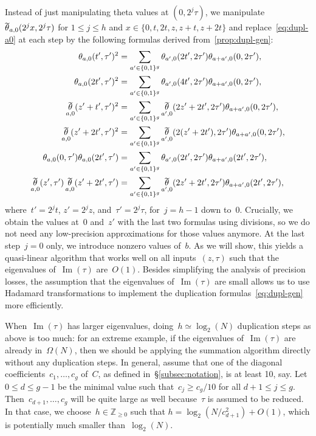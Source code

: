 \documentclass[12pt,oneside]{amsart}
\numberwithin{equation}{section}
\theoremstyle{definition}
\newcommand{\Z}{\mathbb{Z}}
\DeclareMathOperator{\im}{Im}
\DeclareMathOperator{\thetatilde}{\rlap{\raisebox{-0.1ex}{$\widetilde{\phantom{\,t}}$}}\theta}
\begin{document}
Instead of just manipulating theta values at $(0,2^j\tau)$, we manipulate
$\thetatilde_{a,0}(2^j x, 2^j\tau)$ for $1\leq j\leq h$ and
$x\in \{0, t, 2t, z, z+t, z+2t\}$ and replace~\eqref{eq:dupl-a0}
at each step by the following formulas derived from~\cref{prop:dupl-gen}:
\begin{equation}
  \label{eq:dupl-gen}
  \begin{aligned}
    \theta_{a,0}(t', \tau')^2 &= \sum_{a'\in \{0,1\}^g} \theta_{a',0}(2t',2\tau')\theta_{a+a',0}(0,2\tau'),\\
    \theta_{a,0}(2t', \tau')^2 &= \sum_{a'\in \{0,1\}^g} \theta_{a',0}(4t',2\tau')\theta_{a+a',0}(0,2\tau'),\\
    \thetatilde_{a,0}(z'+t', \tau')^2 &= \sum_{a'\in \{0,1\}^g} \thetatilde_{a',0}(2z'+2t',2\tau')\theta_{a+a',0}(0,2\tau'),\\
    \thetatilde_{a,0}(z'+2t', \tau')^2 &= \sum_{a'\in \{0,1\}^g} \thetatilde_{a',0}(2(z'+2t'),2\tau')\theta_{a+a',0}(0,2\tau'),\\
    \theta_{a,0}(0,\tau') \theta_{a,0}(2t', \tau') &= \sum_{a'\in \{0,1\}^g} \theta_{a',0}(2t',2\tau')\theta_{a+a',0}(2t',2\tau'),\\
    \thetatilde_{a,0}(z',\tau') \thetatilde_{a,0}(z'+2t', \tau') &= \sum_{a'\in \{0,1\}^g} \thetatilde_{a',0}(2z'+2t',2\tau')\theta_{a+a',0}(2t',2\tau'),\\
  \end{aligned}
\end{equation}
where~$t' = 2^jt$, $z' = 2^j z$, and~$\tau' = 2^j\tau$, for~$j = h-1$ down
to~$0$. Crucially, we obtain the values at~$0$ and~$z'$ with the last two
formulas using divisions, so we do not need any low-precision approximations
for those values anymore. At the last step~$j=0$ only, we introduce nonzero
values of~$b$. As we will show, this yields a quasi-linear algorithm that works
well on all inputs~$(z,\tau)$ such that the eigenvalues of~$\im(\tau)$
are~$O(1)$. Besides simplifying the analysis of precision losses, the
assumption that the eigenvalues of~$\im(\tau)$ are small allows us to use
Hadamard transformations to implement the duplication
formulas~\eqref{eq:dupl-gen} more efficiently.

When~$\im(\tau)$ has larger eigenvalues, doing~$h\simeq \log_2(N)$ duplication
steps as above is too much: for an extreme example, if the eigenvalues of~$\im(\tau)$
are already in~$\Omega(N)$, then we should be applying the summation algorithm
directly without any duplication steps. In general, assume that one of the
diagonal coefficients~$c_1,\ldots,c_g$ of~$C$, as defined
in~§\ref{subsec:notation}, is at least 10, say. Let $0\leq d\leq g-1$ be the
minimal value such that~$c_j \geq c_g/10$ for all $d+1\leq j\leq
g$. Then~$c_{d+1},\ldots,c_g$ will be quite large as well because~$\tau$ is
assumed to be reduced. In that case, we choose~$h\in \Z_{\geq 0}$ such that
$h = \log_2(N/c_{d+1}^2) + O(1)$, which is potentially much smaller
than~$\log_2(N)$.
\end{document}
